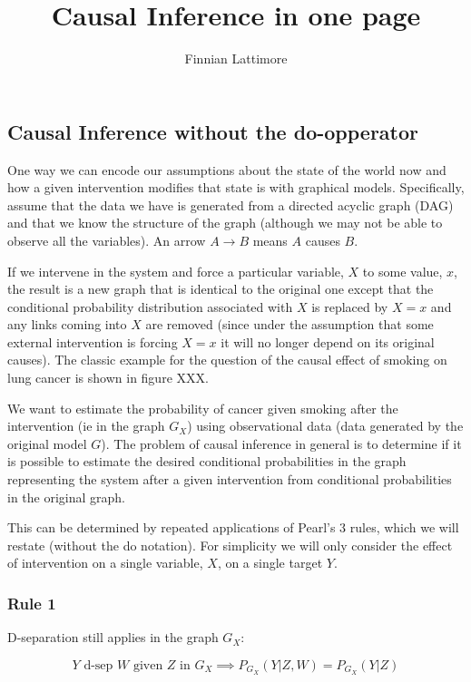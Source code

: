 \documentclass{article}
\author{Finnian Lattimore}
\title{Causal Inference in one page}
\begin{document}
\def\ci{\perp\!\!\!\perp}

\subsection*{Causal Inference without the do-opperator}



One way we can encode our assumptions about the state of the world now and how a given intervention modifies that state is with graphical models. Specifically, assume that the data we have is generated from a directed acyclic graph (DAG) and that we know the structure of the graph (although we may not be able to observe all the variables). An arrow $A \rightarrow B$ means $A$ causes $B$. 

If we intervene in the system and force a particular variable, $X$ to some value, $x$, the result is a new graph that is identical to the original one except that the conditional probability distribution associated with $X$ is replaced by $X=x$ and any links coming into $X$ are removed (since under the assumption that some external intervention is forcing $X=x$ it will no longer depend on its original causes). The classic example for the question of the causal effect of smoking on lung cancer is shown in figure XXX. 

We want to estimate the probability of cancer given smoking after the intervention (ie in the graph $G_X$) using observational data (data generated by the original model $G$). The problem of causal inference in general is to determine if it is possible to estimate the desired conditional probabilities in the graph representing the system after a given intervention from conditional probabilities in the original graph. 

This can be determined by repeated applications of Pearl's 3 rules, which we will restate (without the do notation). For simplicity we will only consider the effect of intervention on a single variable, $X$, on a single target $Y$. 

\subsubsection*{Rule 1}
 D-separation still applies in the graph $G_X$:
 
 \begin{equation}
 Y \text{ d-sep } W \text{ given } Z \text{ in } G_X \implies P_{G_X}(Y|Z,W) = P_{G_X}(Y|Z)
 \end{equation}
\end{document}
